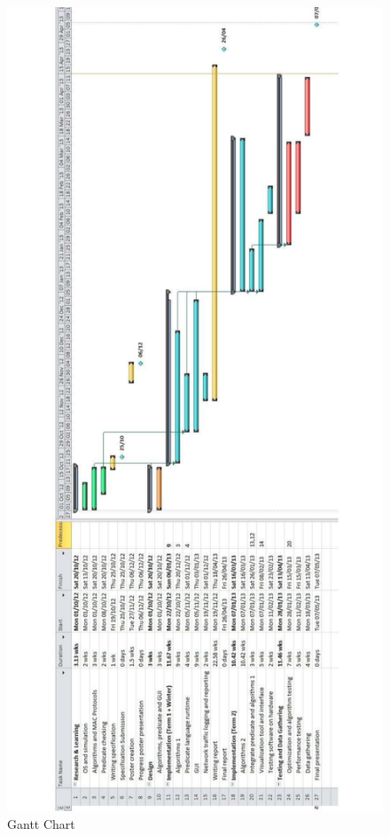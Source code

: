 \begin{figure}[H]
\centering
\includegraphics[height=.9\textheight]{Images/pm-gantt.pdf}
\caption{Gantt Chart}
\label{fig:Gantt Chart of project}
\end{figure}


